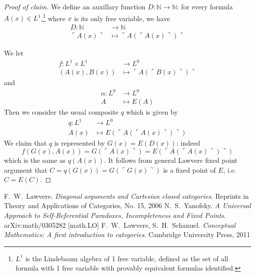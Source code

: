 \documentclass[a4paper]{article}
\newcommand*{\N}{{\mathbb{N}}}
\begin{document}
\begin{proof}[Proof of claim]
  We define an auxillary function \(D: \N \to \N\): for every formula \(A(x) \in L^1\),\footnote{\(L^1\) is the Lindebaum algebra of 1 free variable, defined as the set of all formula with 1 free variable with provably equivalent formulas identified.} where \(x\) is its only free variable, we have
  \begin{align*}
    D: \N &\to \N \\
    \ulcorner A(x) \urcorner &\mapsto \ulcorner A(\ulcorner A(x) \urcorner) \urcorner
  \end{align*}

  We let
  \begin{align*}
    f: L^1 \times L^1 &\to L^0 \\
    (A(x), B(x)) &\mapsto \ulcorner A(\ulcorner B(x) \urcorner) \urcorner
  \end{align*}
  and
  \begin{align*}
    \alpha: L^0 &\to L^0 \\
    A &\mapsto E(A)
  \end{align*}
  Then we consider the usual composite \(q\) which is given by
  \begin{align*}
    q: L^1 &\to L^0 \\
    A(x) &\mapsto E(\ulcorner A(\ulcorner A(x) \urcorner) \urcorner)
  \end{align*}
  We claim that \(q\) is represented by \(G(x) = E(D(x))\): indeed
  \[
    f(G(x), A(x)) = G(\ulcorner A(x) \urcorner) = E(\ulcorner A(\ulcorner A(x) \urcorner) \urcorner)
  \]
  which is the same as \(q(A(x))\). It follows from general Lawvere fixed point argument that \(C = q(G(x)) = G(\ulcorner G(x) \urcorner)\) is a fixed point of \(E\), i.e.\ \(C = E(C)\).
\end{proof}

\begin{thebibliography}{9}
  F.\ W.\ Lawvere.
  \textit{Diagonal arguments and Cartesian closed categories}.
  Reprints in Theory and Applications of Categories, No. 15, 2006
  N.\ S.\ Yanofsky.
  \textit{A Universal Approach to Self-Referential Paradoxes, Incompleteness and Fixed Points}.
  arXiv:math/0305282 [math.LO]
  F.\ W.\ Lawvere, S.\ H.\ Schanuel.
  \textit{Conceptual Mathematics: A first introduction to categories}.
  Cambridge University Press, 2011
\end{thebibliography}
\end{document}
